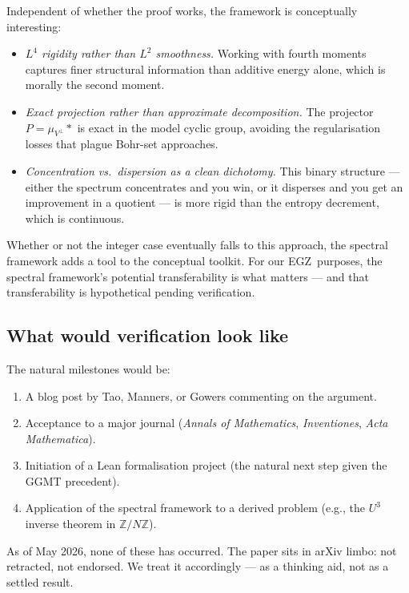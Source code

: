 \documentclass[11pt,a4paper]{article}
\theoremstyle{plain}
\theoremstyle{definition}
\theoremstyle{remark}
\newcommand{\Z}{\mathbb{Z}}
\newcommand{\EGZ}{\textsf{EGZ}}
\begin{document}
Independent of whether the proof works, the framework is conceptually interesting:

\begin{itemize}[leftmargin=2em]
  \item \emph{$L^4$ rigidity rather than $L^2$ smoothness.} Working with fourth moments captures finer structural information than additive energy alone, which is morally the second moment.
  \item \emph{Exact projection rather than approximate decomposition.} The projector $P = \mu_{V^\perp} *$ is exact in the model cyclic group, avoiding the regularisation losses that plague Bohr-set approaches.
  \item \emph{Concentration vs.\ dispersion as a clean dichotomy.} This binary structure --- either the spectrum concentrates and you win, or it disperses and you get an improvement in a quotient --- is more rigid than the entropy decrement, which is continuous.
\end{itemize}

Whether or not the integer case eventually falls to this approach, the spectral framework adds a tool to the conceptual toolkit. For our \EGZ\ purposes, the spectral framework's potential transferability is what matters --- and that transferability is hypothetical pending verification.

\subsection{What would verification look like}

The natural milestones would be:

\begin{enumerate}[leftmargin=2em]
  \item A blog post by Tao, Manners, or Gowers commenting on the argument.
  \item Acceptance to a major journal (\emph{Annals of Mathematics}, \emph{Inventiones}, \emph{Acta Mathematica}).
  \item Initiation of a Lean formalisation project (the natural next step given the GGMT precedent).
  \item Application of the spectral framework to a derived problem (e.g., the $U^3$ inverse theorem in $\Z/N\Z$).
\end{enumerate}

As of May 2026, none of these has occurred. The paper sits in arXiv limbo: not retracted, not endorsed. We treat it accordingly --- as a thinking aid, not as a settled result.
\end{document}
